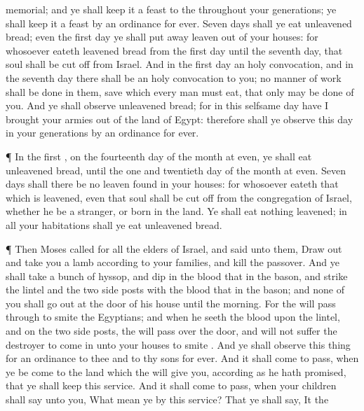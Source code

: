 {memorial; and ye shall
keep it a
feast to the
{} throughout your
generations; ye shall keep it a
feast by an
ordinance for
ever.
Seven
days shall ye
eat unleavened
bread;
even the
first
day ye shall put
away
leaven out of your
houses: for whosoever
eateth leavened
bread from the
first
day until the
seventh
day, that
soul shall be
cut off from
Israel.
And in the
first
day
{} an
holy
convocation, and in the
seventh
day there shall be an
holy
convocation to you; no manner of
work shall be
done in them,
save
{} which every
man must
eat, that only may be
done of you.
And ye shall
observe
{} unleavened
bread; for in this
selfsame
day have I
brought your
armies out of the
land of
Egypt: therefore shall ye
observe this
day in your
generations by an
ordinance for
ever.
\par }{\PP {}¶ In the
first
{}, on the
fourteenth
day of the
month at
even, ye shall
eat unleavened
bread, until the
one and
twentieth
day of the
month at
even.
Seven
days shall there be no
leaven
found in your
houses: for whosoever
eateth that which is
leavened, even that
soul shall be cut
off from the
congregation of
Israel, whether he be a
stranger, or
born in the
land.
Ye shall
eat nothing
leavened; in all your
habitations shall ye
eat unleavened
bread.
\par }{\PP {}¶ Then
Moses
called for all the
elders of
Israel, and
said unto them, Draw
out and
take you a
lamb according to your
families, and
kill the
passover.
And ye shall
take a
bunch of
hyssop, and
dip
{} in the
blood that
{} in the
bason, and
strike the
lintel and the
two side
posts with the
blood that
{} in the
bason; and
none of you shall go
out at the
door of his
house until the
morning.
For the
{} will pass
through to
smite the
Egyptians; and when he
seeth the
blood upon the
lintel, and on the
two side
posts, the
{} will pass
over the
door, and will not
suffer the
destroyer to
come in unto your
houses to
smite
{}.
And ye shall
observe this
thing for an
ordinance to thee and to thy
sons
for
ever.
And it shall come to pass, when ye be
come to the
land which the
{} will
give you, according as he hath
promised, that ye shall
keep this
service.
And it shall come to pass, when your
children shall
say unto you, What mean ye by this
service?
That ye shall
say, It
{} the
}
